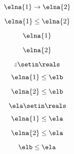 {\begin{forslides}
        \begin{equation}
            \label{eq:parallelism-132}
            \elna{1}\to \elna{2}
        \end{equation}

        \begin{equation}
            \label{eq:parallelism-133}
            \elna{1}\leq \elna{2}
        \end{equation}

        \begin{equation}
            \label{eq:parallelism-134}
            \elna{1}
        \end{equation}

        \begin{equation}
            \label{eq:parallelism-135}
            \elna{2}
        \end{equation}

        \begin{equation}
            \label{eq:parallelism-136}
            z\setin \reals
        \end{equation}

        \begin{equation}
            \label{eq:parallelism-137}
            \elna{1}\leq \elb
        \end{equation}

        \begin{equation}
            \label{eq:parallelism-138}
            \elna{2}\leq \elb
        \end{equation}

        \begin{equation}
            \label{eq:parallelism-139}
            \ela\setin \reals
        \end{equation}

        \begin{equation}
            \label{eq:parallelism-140}
            \elna{1}\leq \ela
        \end{equation}

        \begin{equation}
            \label{eq:parallelism-141}
            \elna{2}\leq \ela
        \end{equation}

        \begin{equation}
            \label{eq:parallelism-142}
            \elb\leq \ela
        \end{equation}


\end{forslides}}
